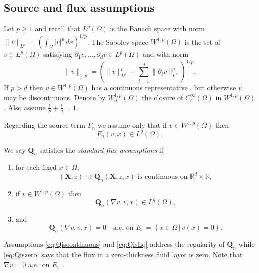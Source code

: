 \documentclass[final,onefignum]{siamart190516}
\newcommand\bQ{\mathbf{Q}}
\newcommand\bX{\mathbf{X}}
\newcommand{\grad}{\nabla}
\newcommand\RR{\mathbb{R}}
\begin{document}
\subsection{Source and flux assumptions} \label{subsec:fluxassumptions}  Let $p\ge 1$ and recall that $L^p (\Omega)$ is the Banach space with norm $\|v\|_{L^p} = \left(\int_\Omega |v|^p\,dx\right)^{1/p}$.  The Sobolev space $W^{1,p}(\Omega)$ \cite{Evans2010} is the set of $v \in L^p(\Omega)$ satisfying $\partial_1 v,\dots,\partial_d v \in L^p(\Omega)$ and with norm
\begin{equation}
  \|v\|_{1,p} = \left(\|v\|_{L^p}^p + \sum_{i=1}^d \|\partial_i v\|_{L^p}^p\right)^{1/p}.  \label{eq:norm}
\end{equation}
If $p>d$ then $v\in W^{1,p}(\Omega)$ has a continuous representative \cite[``Morrey's inequality'']{Evans2010}, but otherwise $v$ may be discontinuous.  Denote by $W_0^{1,p}(\Omega)$ the closure of $C_c^\infty(\Omega)$ in $W^{1,p}(\Omega)$.  Also assume $\frac{1}{p}+\frac{1}{q}=1$.

Regarding the source term $F_n$ we assume only that if $v\in W^{1,p}(\Omega)$ then
\begin{equation}
F_n(v,x) \in L^q(\Omega).  \label{eq:FisLq}
\end{equation}

\begin{definition}  \label{ass:std}  We say $\bQ_n$ satisfies the \emph{standard flux assumptions} if
\renewcommand{\labelenumi}{\emph{\roman{enumi}})}
\begin{enumerate}
\item for each fixed $x\in \Omega$,
\begin{equation}
(\bX,z) \mapsto \bQ_n(\bX,z,x) \text{ is continuous on } \RR^d \times \RR,  \label{eq:Qiscontinuous}
\end{equation}
\item if $v \in W^{1,p}(\Omega)$ then
\begin{equation}
\bQ_n(\grad v,v,x) \in L^q(\Omega), \label{eq:QisLq}
\end{equation}
\item and
\begin{equation}
\bQ_n(\grad v,v,x)=0 \quad \text{a.e.~on } E_v = \left\{x\in\Omega\,\big|\,v(x)=0\right\}. \label{eq:Qiszero}
\end{equation}
\end{enumerate}
\end{definition}
Assumptions \eqref{eq:Qiscontinuous} and \eqref{eq:QisLq} address the regularity of $\bQ_n$ while \eqref{eq:Qiszero} says that the flux in a zero-thickness fluid layer is zero.  Note that $\grad v = 0$ a.e.~on $E_v$ \cite[lemma A.4 in chapter II]{KinderlehrerStampacchia1980}.
\end{document}
